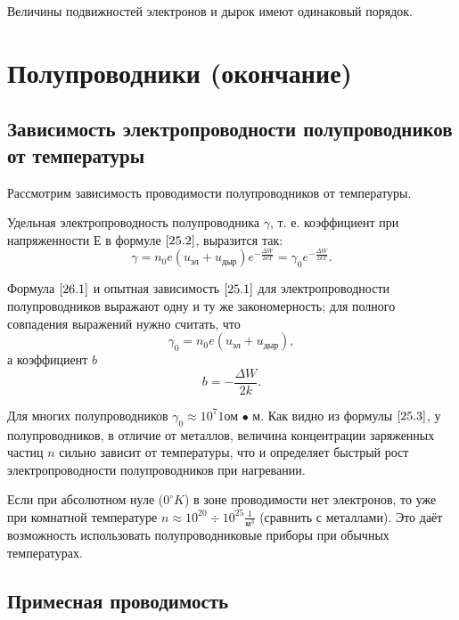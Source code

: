 \documentclass[a4paper,10pt]{book}
\begin{document}
Величины подвижностей электронов и дырок имеют одинаковый порядок.

\chapter{Полупроводники (окончание)}
\section{Зависимость электропроводности полупроводников от температуры}

Рассмотрим зависимость проводимости полупроводников от температуры.

Удельная электропроводность полупроводника $\gamma$, т. е. коэффициент при напряженности $Е$ в формуле $\ref{25.2}$, выразится так:
\begin{equation}\label{26.1}
\gamma = n_0 e(u_{\text{эл}} + u_{\text{дыр}})e^{-\frac{\Delta W}{2kT}}=\gamma_0 e^{-\frac{\Delta W}{2kT}}.
\end{equation}

Формула $\ref{26.1}$ и опытная зависимость $\ref{25.1}$ для электропроводности полупроводников выражают одну и ту же закономерность; для полного совпадения выражений нужно считать, что
\begin{equation}\label{26.2}
\gamma_0 = n_0 e(u_{\text{эл}} + u_{\text{дыр}}),
\end{equation}а коэффициент $b$
\begin{equation}\label{26.3}
b = -\frac{\Delta W}{2k}.
\end{equation}

Для многих полупроводников $\gamma_0 \approx 10^7 1\text{ом • м}$. Как видно из формулы $\ref{25.3}$, у полупроводников, в отличие от металлов, величина концентрации заряженных частиц $n$ сильно зависит от температуры, что и определяет быстрый рост электропроводности полупроводников при нагревании.

Если при абсолютном нуле ($0^\circ K$) в зоне проводимости нет электронов, то уже при комнатной температуре $n \approx 10^{20} \div 10^{25}\frac{1}{\textit{м}^3}$ (сравнить с металлами). Это даёт возможность использовать полупроводниковые приборы при обычных температурах.

\section{Примесная проводимость}
\end{document}
